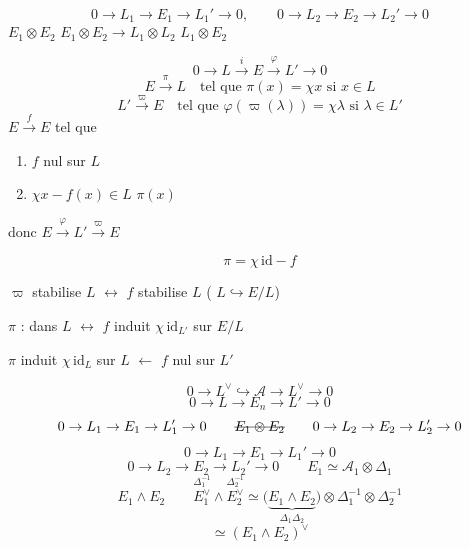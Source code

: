 \documentclass[11pt,a4paper]{article}
\begin{document}


\[
0 \to L_1 \to E_1 \to L_1' \to 0, \qquad 0 \to L_2 \to E_2 \to L_2' \to 0
\]
$E_1 \otimes E_2$ \qquad $E_1 \otimes E_2 \to L_1 \otimes L_2$ \qquad $L_1 \otimes E_2$

\[
0 \to L \xrightarrow{\;i\;} E \xrightarrow{\;\varphi\;} L' \to 0
\]
\[
E \xrightarrow{\;\pi\;} L \quad \text{tel que } \pi(x) = \chi x \text{ si } x \in L
\]
\[
L' \xrightarrow{\;\varpi\;} E \quad \text{tel que } \varphi(\varpi(\lambda)) = \chi \lambda \text{ si } \lambda \in L'
\]
$E \xrightarrow{f} E$ tel que
\begin{enumerate}
\item[1°)] $f$ nul sur $L$
\item[2°)]  $\chi x - f(x) \in L$ \quad {} \quad $\pi(x)$
\end{enumerate}
donc $E \xrightarrow{\varphi} L' \xrightarrow{\varpi} E$ \ill{}

\[
\boxed{\pi = \chi\,\mathrm{id} - f}
\]


$\varpi$ stabilise $L$ \quad $\longleftrightarrow$ $f$ stabilise $L$ \quad ( $L \hookrightarrow E/L$)

$\pi$ :  dans $L$ $\longleftrightarrow$ $f$ induit \struck{\ill{}} $\chi\,\mathrm{id}_{L'}$ sur $E/L$

$\pi$ induit $\chi\,\mathrm{id}_L$ sur $L$ $\longleftarrow$ $f$ nul sur $L'$


\[
0 \to L^{\vee} \hookrightarrow \mathcal{A} \to L^{\vee} \to 0
\]
\[
0 \to L \to E_n \to L' \to 0
\]
\[
0 \to L_1 \to E_1 \to L_1' \to 0 \qquad \text{\struck{$E_1 \otimes E_2$}} \qquad 0 \to L_2 \to E_2 \to L_2' \to 0
\]
\[
0 \to L_1 \to E_1 \to L_1' \to 0
\]
\[
0 \to L_2 \to E_2 \to L_2' \to 0 \qquad E_1 \simeq \mathcal{A}_1 \otimes \Delta_1
\]
\[
E_1 \wedge E_2 \qquad
\overset{\Delta_1^{-1}}{E_1^{\vee}} \wedge \overset{\Delta_2^{-1}}{E_2^{\vee}}
\simeq \bigl(\underbrace{E_1 \wedge E_2}_{\Delta_1 \Delta_2}\bigr) \otimes \Delta_1^{-1} \otimes \Delta_2^{-1}
\]
\[
\simeq (E_1 \wedge E_2)^{\vee}
\]
\end{document}
